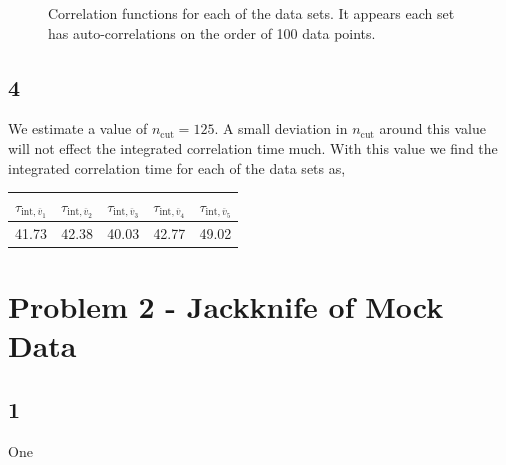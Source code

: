 \documentclass[singlepage,notitlepage,nofootinbib,11pt]{revtex4-1}
\begin{document}
\begin{figure}[h]
\hfill
  \caption{\label{corrs} Correlation functions for each of the data sets. It appears each set has auto-correlations on the order of 100 data points.}
\end{figure}
\clearpage
\subsection{4}
We estimate a value of $n_{\text{cut}}=125$. A small deviation in $n_{\text{cut}}$ around this value will not effect the integrated correlation time much. With this value we find the integrated correlation time for each of the data sets as,
\begin{center}
\begin{tabular}{ | c | c | c | c | c |}\hline
  $\tau_{\text{int},\overline{v}_1}$ &  $\tau_{\text{int},\overline{v}_2}$ &  $\tau_{\text{int},\overline{v}_3}$ &  $\tau_{\text{int},\overline{v}_4}$ &  $\tau_{\text{int},\overline{v}_5}$  \\ \hline \hline 
  41.73 & 42.38 & 40.03 & 42.77 & 49.02 \\ \hline
\end{tabular}
\end{center}
\section{Problem 2 - Jackknife of Mock Data}
\subsection{1}
One
\end{document}
